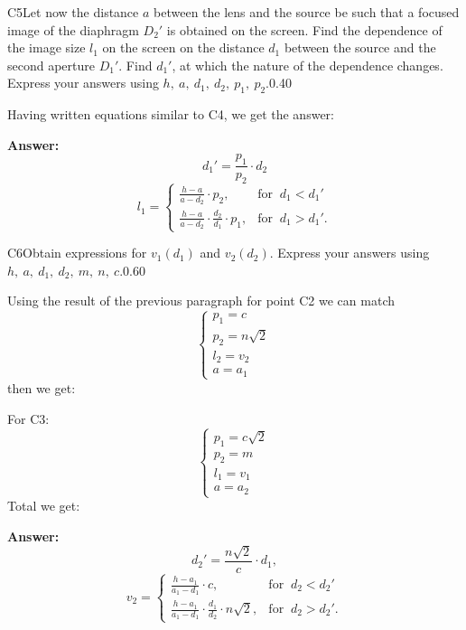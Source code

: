 \documentclass[11pt,a4paper]{article}
\begin{document}
\begin{solcard}{C5}{Let now the distance $a$ between the lens and the source be such that a focused image of the diaphragm $D_2'$ is obtained on the screen. Find the dependence of the image size $l_1$ on the screen on the distance $d_1$ between the source and the second aperture $D_1'$. Find $d_{1}'$, at which the nature of the dependence changes. Express your answers using $h,~a,~d_1,~d_2,~p_1,~p_2$.}{0.40}

Having written equations similar to C4, we get the answer:

\par\smallskip\noindent\textbf{Answer:} $$d_1' = \frac{p_1}{p_2} \cdot d_2$$$$ l_1 = \begin{cases} \frac{h-a}{a-d_2} \cdot p_2, & \text{for }\ d_1 < d_1' \\ \frac{h-a}{a-d_2} \cdot \frac{d_2}{d_1} \cdot p_1, & \text{for }\ d_1 > d_1'. \end{cases} $$
\end{solcard}

\begin{solcard}{C6}{Obtain expressions for $v_1(d_1)$ and $v_2(d_2)$. Express your answers using $h,~a,~d_1,~d_2,~m,~n,~c$.}{0.60}

Using the result of the previous paragraph for point C2 we can match $$ \begin{cases} p_1 = c\\ p_2 = n\sqrt{2}\\ l_2 = v_2\\ a = a_1 \end{cases}$$ then we get:


For C3: $$\begin{cases} p_1 = c\sqrt{2}\\ p_2 = m\\ l_1 = v_1\\ a = a_2 \end{cases}$$ Total we get:

\par\smallskip\noindent\textbf{Answer:} $$d_2' =  \frac{n\sqrt{2}}{c} \cdot d_1,$$ $$ v_2 = \begin{cases} \frac{h-a_1}{a_1-d_1} \cdot c, & \text{for }\ d_2 < d_2' \\ \frac{h-a_1}{a_1-d_1} \cdot \frac{d_1}{d_2} \cdot n\sqrt{2}, & \text{for }\ d_2 > d_2'. \end{cases} $$
\end{solcard}
\end{document}
